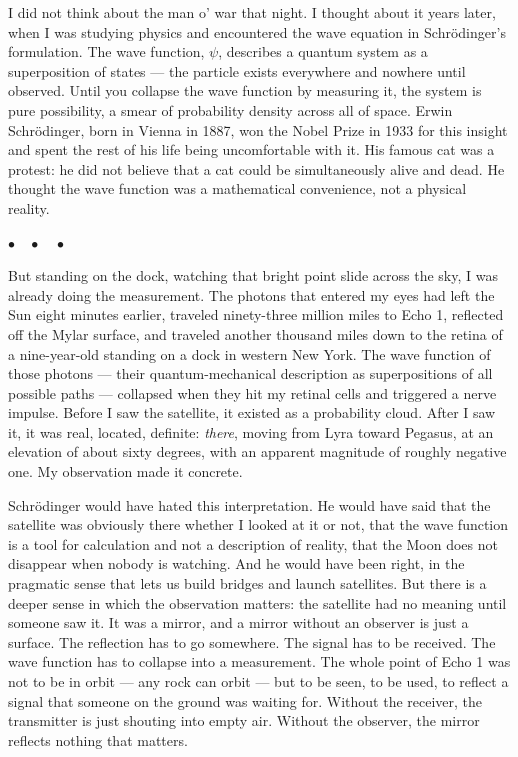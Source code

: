 \documentclass[12pt, letterpaper]{article}
\begin{document}
I did not think about the man o' war that night. I thought about it years later, when I was studying physics and encountered the wave equation in Schr\"odinger's formulation. The wave function, $\psi$, describes a quantum system as a superposition of states --- the particle exists everywhere and nowhere until observed. Until you collapse the wave function by measuring it, the system is pure possibility, a smear of probability density across all of space. Erwin Schr\"odinger, born in Vienna in 1887, won the Nobel Prize in 1933 for this insight and spent the rest of his life being uncomfortable with it. His famous cat was a protest: he did not believe that a cat could be simultaneously alive and dead. He thought the wave function was a mathematical convenience, not a physical reality.

\begin{center}
$\bullet\quad\bullet\quad\bullet$
\end{center}

But standing on the dock, watching that bright point slide across the sky, I was already doing the measurement. The photons that entered my eyes had left the Sun eight minutes earlier, traveled ninety-three million miles to Echo 1, reflected off the Mylar surface, and traveled another thousand miles down to the retina of a nine-year-old standing on a dock in western New York. The wave function of those photons --- their quantum-mechanical description as superpositions of all possible paths --- collapsed when they hit my retinal cells and triggered a nerve impulse. Before I saw the satellite, it existed as a probability cloud. After I saw it, it was real, located, definite: \emph{there}, moving from Lyra toward Pegasus, at an elevation of about sixty degrees, with an apparent magnitude of roughly negative one. My observation made it concrete.

Schr\"odinger would have hated this interpretation. He would have said that the satellite was obviously there whether I looked at it or not, that the wave function is a tool for calculation and not a description of reality, that the Moon does not disappear when nobody is watching. And he would have been right, in the pragmatic sense that lets us build bridges and launch satellites. But there is a deeper sense in which the observation matters: the satellite had no meaning until someone saw it. It was a mirror, and a mirror without an observer is just a surface. The reflection has to go somewhere. The signal has to be received. The wave function has to collapse into a measurement. The whole point of Echo 1 was not to be in orbit --- any rock can orbit --- but to be seen, to be used, to reflect a signal that someone on the ground was waiting for. Without the receiver, the transmitter is just shouting into empty air. Without the observer, the mirror reflects nothing that matters.
\end{document}
